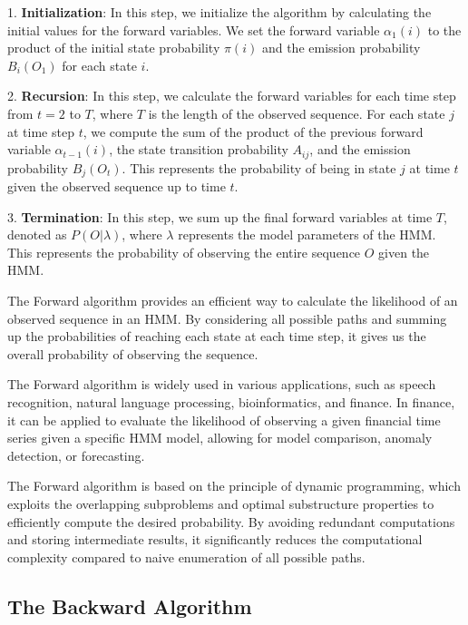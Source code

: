 \documentclass[a4paper,11pt]{article}
\begin{document}
1. \textbf{Initialization}: In this step, we initialize the algorithm by calculating the initial values for the forward variables. We set the forward variable $\alpha_1(i)$ to the product of the initial state probability $\pi(i)$ and the emission probability $B_{i}(O_1)$ for each state $i$.

2. \textbf{Recursion}: In this step, we calculate the forward variables for each time step from $t = 2$ to $T$, where $T$ is the length of the observed sequence. For each state $j$ at time step $t$, we compute the sum of the product of the previous forward variable $\alpha_{t-1}(i)$, the state transition probability $A_{ij}$, and the emission probability $B_{j}(O_t)$. This represents the probability of being in state $j$ at time $t$ given the observed sequence up to time $t$.

3. \textbf{Termination}: In this step, we sum up the final forward variables at time $T$, denoted as $P(O|\lambda)$, where $\lambda$ represents the model parameters of the HMM. This represents the probability of observing the entire sequence $O$ given the HMM.

The Forward algorithm provides an efficient way to calculate the likelihood of an observed sequence in an HMM. By considering all possible paths and summing up the probabilities of reaching each state at each time step, it gives us the overall probability of observing the sequence.

The Forward algorithm is widely used in various applications, such as speech recognition, natural language processing, bioinformatics, and finance. In finance, it can be applied to evaluate the likelihood of observing a given financial time series given a specific HMM model, allowing for model comparison, anomaly detection, or forecasting.

The Forward algorithm is based on the principle of dynamic programming, which exploits the overlapping subproblems and optimal substructure properties to efficiently compute the desired probability. By avoiding redundant computations and storing intermediate results, it significantly reduces the computational complexity compared to naive enumeration of all possible paths.

\subsection{The Backward Algorithm}
\label{sec:backward}
\end{document}
